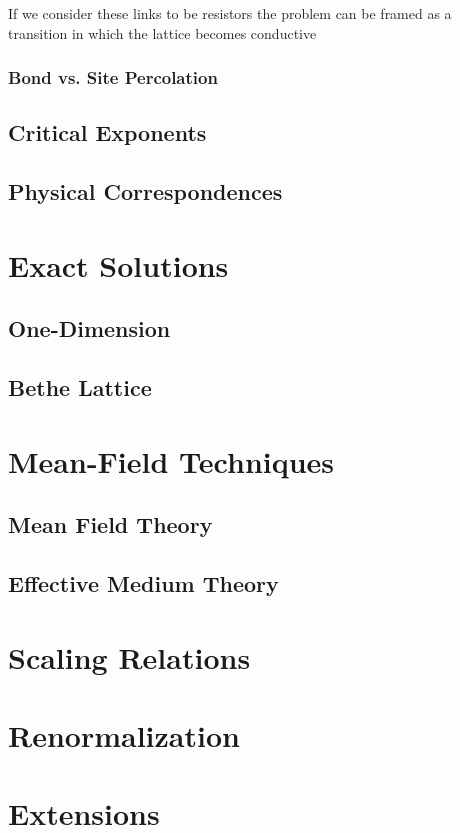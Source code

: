 If we consider these links to be resistors the problem can be framed as
a transition in which the lattice becomes conductive

\subsubsection{Bond vs. Site Percolation}
\subsection{Critical Exponents}
\subsection{Physical Correspondences}
\section{Exact Solutions}
\subsection{One-Dimension}
\subsection{Bethe Lattice}
\section{Mean-Field Techniques}
\subsection{Mean Field Theory}
\subsection{Effective Medium Theory}
\section{Scaling Relations}
\section{Renormalization}
\section{Extensions}

